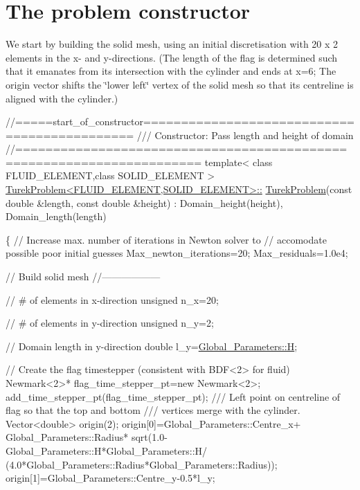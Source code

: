 



 

\hypertarget{index_constructor}{}\section{The problem constructor}\label{index_constructor}
We start by building the solid mesh, using an initial discretisation with 20 x 2 elements in the x-\/ and y-\/directions. (The length of the flag is determined such that it emanates from its intersection with the cylinder and ends at x=6; The {\ttfamily origin} vector shifts the \char`\"{}lower left\char`\"{} vertex of the solid mesh so that its centreline is aligned with the cylinder.)


\begin{DoxyCodeInclude}
\textcolor{comment}{//=====start\_of\_constructor============================================= }
\textcolor{comment}{/// Constructor: Pass length and height of domain}
\textcolor{comment}{}\textcolor{comment}{//====================================================================== }
\textcolor{keyword}{template}< \textcolor{keyword}{class} FLUID\_ELEMENT,\textcolor{keyword}{class} SOLID\_ELEMENT >
\hyperlink{classTurekProblem_a69f6624fd854393f0c0e5303603ec749}{TurekProblem<FLUID\_ELEMENT,SOLID\_ELEMENT>::}
\hyperlink{classTurekProblem_a69f6624fd854393f0c0e5303603ec749}{TurekProblem}(\textcolor{keyword}{const} \textcolor{keywordtype}{double} &length,
             \textcolor{keyword}{const} \textcolor{keywordtype}{double} &height) :  Domain\_height(height),
                                      Domain\_length(length)
 
\{
 \textcolor{comment}{// Increase max. number of iterations in Newton solver to}
 \textcolor{comment}{// accomodate possible poor initial guesses}
 Max\_newton\_iterations=20;
 Max\_residuals=1.0e4;

 \textcolor{comment}{// Build solid mesh}
 \textcolor{comment}{//------------------}

 \textcolor{comment}{// # of elements in x-direction}
 \textcolor{keywordtype}{unsigned} n\_x=20;

 \textcolor{comment}{// # of elements in y-direction}
 \textcolor{keywordtype}{unsigned} n\_y=2;

 \textcolor{comment}{// Domain length in y-direction }
 \textcolor{keywordtype}{double} l\_y=\hyperlink{namespaceGlobal__Parameters_ab360628e7830e43e355ce5768f6d6a6c}{Global\_Parameters::H};

 \textcolor{comment}{// Create the flag timestepper (consistent with BDF<2> for fluid)}
 Newmark<2>* flag\_time\_stepper\_pt=\textcolor{keyword}{new} Newmark<2>;
 add\_time\_stepper\_pt(flag\_time\_stepper\_pt); 
\textcolor{comment}{}
\textcolor{comment}{ /// Left point on centreline of flag so that the top and bottom}
\textcolor{comment}{ /// vertices merge with the cylinder.}
\textcolor{comment}{} Vector<double> origin(2);
 origin[0]=Global\_Parameters::Centre\_x+
  Global\_Parameters::Radius*
  sqrt(1.0-Global\_Parameters::H*Global\_Parameters::H/
       (4.0*Global\_Parameters::Radius*Global\_Parameters::Radius));
 origin[1]=Global\_Parameters::Centre\_y-0.5*l\_y;


\end{DoxyCodeInclude}
